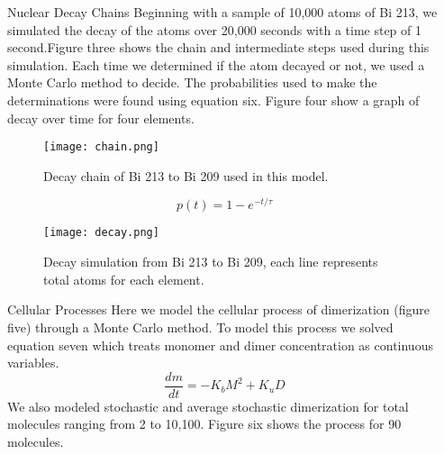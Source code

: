 \documentclass[final]{beamer}
\newlength{\sepwid}
\newlength{\onecolwid}
\begin{document}
\begin{frame}[t]
\begin{columns}[t]
\begin{column}{\onecolwid}
\begin{block}{Nuclear Decay Chains}
Beginning with a sample of 10,000 atoms of Bi 213, we simulated the decay of the atoms over 20,000 seconds with a time step of 1 second.Figure three shows the chain and intermediate steps used during this simulation. Each time we determined if the atom decayed or not, we used a Monte Carlo method to decide. The probabilities used to make the determinations were found using equation six. Figure four show a graph of decay over time for four elements.
\begin{figure}
\texttt{[image: chain.png]}
\caption{Decay chain of Bi 213 to Bi 209 used in this model.}
\end{figure}
\begin{equation}
p(t) = 1 - e^{-t/\tau}
\end{equation}
\begin{figure}
\texttt{[image: decay.png]}
\caption{Decay simulation from Bi 213 to Bi 209, each line represents total atoms for each element.}
\end{figure}
\end{block}


\begin{block}{Cellular Processes}
Here we model the cellular process of dimerization (figure five) through a Monte Carlo method. To model this process we solved equation seven which treats monomer and dimer concentration as continuous variables. 
\begin{equation}
\frac{dm}{dt} = -K_{b}M^{2}+K_{u}D
\end{equation}
We also modeled stochastic and average stochastic dimerization for total molecules ranging from 2 to 10,100. Figure six shows the process for 90 molecules.
\end{block}

\end{column} %

\begin{column}{\sepwid}\end{column} %


\end{columns}
\end{frame}
\end{document}
